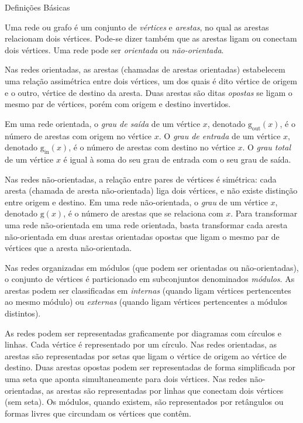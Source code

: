 \begin{section}{Definições Básicas}
	
	Uma rede ou grafo é um conjunto de \emph{vértices} e \emph{arestas}, no qual as arestas relacionam dois vértices. Pode-se dizer também que as arestas ligam ou conectam dois vértices. Uma rede pode ser \emph{orientada} ou \emph{não-orientada}. 
	
	Nas redes orientadas, as arestas (chamadas de arestas orientadas) estabelecem uma relação assimétrica entre dois vértices, um dos quais é dito vértice de origem e o outro, vértice de destino da aresta. Duas arestas são ditas \emph{opostas} se ligam o mesmo par de vértices, porém com origem e destino invertidos. 
	
	Em uma rede orientada, o \emph{grau de saída} de um vértice $x$, denotado $\mathrm{g}_\mathrm{out}(x)$, é o número de arestas com origem no vértice $x$. O \emph{grau de entrada} de um vértice $x$, denotado $\mathrm{g}_\mathrm{in}(x)$, é o número de arestas com destino no vértice $x$. O \emph{grau total} de um vértice $x$ é igual à soma do seu grau de entrada com o seu grau de saída.
	
	Nas redes não-orientadas, a relação entre pares de vértices é simétrica: cada aresta (chamada de aresta não-orientada) liga dois vértices, e não existe distinção entre origem e destino. Em uma rede não-orientada, o \emph{grau} de um vértice $x$, denotado $\mathrm{g}(x)$, é o número de arestas que se relaciona com $x$. Para transformar uma rede não-orientada em uma rede orientada, basta transformar cada aresta não-orientada em duas arestas orientadas opostas que ligam o mesmo par de vértices que a aresta não-orientada. 
	
	Nas redes organizadas em módulos (que podem ser orientadas ou não-orientadas), o conjunto de vértices é particionado em subconjuntos denominados \emph{módulos}. As arestas podem ser classificadas em \emph{internas} (quando ligam vértices pertencentes ao mesmo módulo) ou \emph{externas} (quando ligam vértices pertencentes a módulos distintos).
	
	As redes podem ser representadas graficamente por diagramas com círculos e linhas. Cada vértice é representado por um círculo. Nas redes orientadas, as arestas são representadas por setas que ligam o vértice de origem ao vértice de destino. Duas arestas opostas podem ser representadas de forma simplificada por uma seta que aponta simultaneamente para dois vértices. Nas redes não-orientadas, as arestas são representadas por linhas que conectam dois vértices (sem seta). Os módulos, quando existem, são representados por retângulos ou formas livres que circundam os vértices que contêm.

\end{section}

